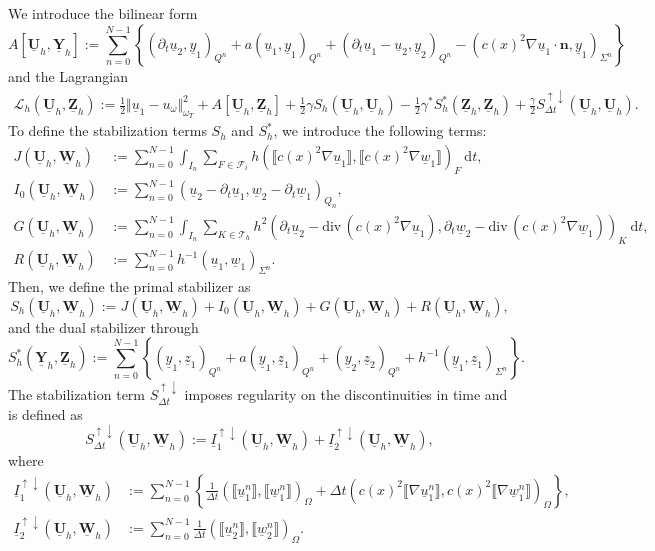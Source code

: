 \documentclass[10pt,reqno]{amsart}
\numberwithin{equation}{section}
\newcommand{\jump}[1]{\llbracket#1\rrbracket}
\newcommand{\cL}{\mathcal{L}}
\renewcommand{\div}{\mathrm{div}\,}  %
\newcommand{\dT}{\mathrm{d}t}
\newcommand{\Uh}{\underline{\mathbf{U}}_h}
\newcommand{\Yh}{\underline{\mathbf{Y}}_h}
\newcommand{\Zh}{\underline{\mathbf{Z}}_h}
\newcommand{\Wh}{\underline{\mathbf{W}}_h}
\newcommand{\ul}{\underline{u}}
\newcommand{\yl}{\underline{y}}
\newcommand{\zl}{\underline{z}}
\newcommand{\wl}{\underline{w}}
\newcommand{\Sud}{S^{\uparrow \downarrow}_{\Delta t}}
\newcommand{\dt}{\partial_t}
\begin{document}
We introduce the bilinear form 
\begin{equation}
    A[\Uh,\Yh] := \sum_{n = 0}^{N -1} \left\{ (\dt \ul_2, \yl_1)_{Q^n} + a(\ul_1,\yl_1)_{Q^n} + (\dt \ul_1 - \ul_2,\yl_2)_{Q^n} - (c(x)^2 \nabla \ul_1 \cdot \mathbf{n}, \yl_1)_{\Sigma^n} \right\}
\end{equation} 
and the Lagrangian 
\begin{align*}
    \cL_h (\Uh, \Zh) := \frac{1}{2} \Vert \ul_1 - u_{\omega} \Vert^2_{\omega_T} + A[\Uh,\Zh] + \frac{1}{2} \gamma S_h(\Uh,\Uh) - \frac{1}{2} \gamma^\ast S_h^\ast(\Zh,\Zh) + \frac{\gamma}{2} \Sud(\Uh,\Uh).
\end{align*}
To define the stabilization terms $S_h$ and $S_h^\ast$, we introduce the following terms: 
\begin{align*}
    J(\Uh,\Wh) &:= \sum_{n = 0}^{N -1} \int_{I_n} \sum_{F \in \mathcal{F}_i} h (\jump{c(x)^2 \nabla \ul_1}, \jump{c(x)^2 \nabla \wl_1})_F \ \dT, \\
    I_0(\Uh,\Wh) &:= \sum_{n = 0}^{N -1} (\ul_2 - \dt \ul_1, \wl_2-\dt \wl_1)_{Q_n}, \\
    G(\Uh,\Wh) &:= \sum_{n = 0}^{N -1} \int_{I_n} \sum_{K \in \mathcal{T}_h} h^2 (\dt \ul_2 - \div (c(x)^2 \nabla \ul_1),\dt \wl_2 -\div( c(x)^2 \nabla \wl_1))_K \ \dT, \\
    R(\Uh,\Wh) &:= \sum_{n = 0}^{N -1} h^{-1} (\ul_1,\wl_1)_{\Sigma^n}. 
\end{align*}
Then, we define the primal stabilizer as 
\begin{equation}
    S_h(\Uh,\Wh) := J(\Uh,\Wh) + I_0(\Uh,\Wh) + G(\Uh,\Wh) + R(\Uh,\Wh), 
\end{equation}
and the dual stabilizer through 
\begin{equation}
    S_h^\ast(\Yh,\Zh) := \sum_{n = 0}^{N-1} \left\{ (\yl_1,\zl_1)_{Q^n} + a(\yl_1,\zl_1)_{Q^n} + (\yl_2,\zl_2)_{Q^n} + h^{-1} (\yl_1,\zl_1)_{\Sigma^n} \right\}.
\end{equation}
The stabilization term $\Sud$ imposes regularity on the discontinuities in time and is defined as 
\begin{equation}
    \Sud (\Uh,\Wh) := \underline{I}_1^{\uparrow \downarrow}(\Uh,\Wh) + \underline{I}_2^{\uparrow \downarrow}(\Uh,\Wh),
\end{equation}
where 
\begin{align*}
    \underline{I}_1^{\uparrow \downarrow}(\Uh,\Wh) &:= \sum_{n = 0}^{N-1} \left\{ \frac{1}{\Delta t} (\jump{\ul_1^n},\jump{\wl_1^n})_{\Omega} + \Delta t (c(x)^2 \jump{\nabla \ul_1^n},c(x)^2 \jump{\nabla \wl_1^n})_{\Omega}\right\}, \\
    \underline{I}_2^{\uparrow \downarrow}(\Uh,\Wh) &:= \sum_{n = 0}^{N-1} \frac{1}{\Delta t} (\jump{\ul_2^n},\jump{\wl_2^n})_{\Omega}.
\end{align*}
\end{document}
